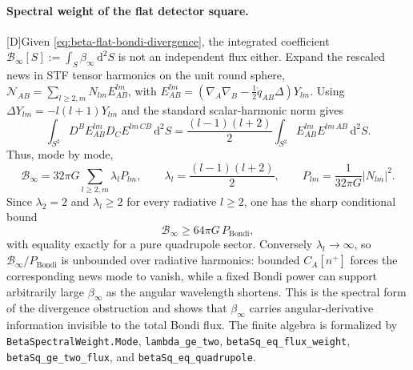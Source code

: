 \documentclass[11pt,a4paper]{article}
\newcommand{\diff}{\mathrm{d}}
\newcommand{\statusD}{\textsf{[D]}}
\begin{document}
\paragraph{Spectral weight of the flat detector square.}
\statusD Given \eqref{eq:beta-flat-bondi-divergence}, the integrated coefficient
\(\mathcal B_\infty[S]:=\int_S\beta_\infty\,\diff^2S\) is not an independent flux either.  Expand the rescaled news in STF tensor harmonics on the unit round sphere,
\(\mathcal N_{AB}=\sum_{l\ge2,m}N_{lm}E^{lm}_{AB}\), with
\(E^{lm}_{AB}=(\nabla_A\nabla_B-\tfrac12\mathring q_{AB}\Delta)Y_{lm}\).  Using
\(\Delta Y_{lm}=-l(l+1)Y_{lm}\) and the standard scalar-harmonic norm gives
\begin{equation}\label{eq:tensor-harmonic-divergence}
  \int_{S^2}D^BE^{lm}_{AB}D_CE^{lm\,CB}\,\diff^2S
  =
  \frac{(l-1)(l+2)}{2}
  \int_{S^2}E^{lm}_{AB}E^{lm\,AB}\,\diff^2S .
\end{equation}
Thus, mode by mode,
\begin{equation}\label{eq:beta-spectral-weight}
  \mathcal B_\infty
  =
  32\pi G\sum_{l\ge2,m}\lambda_l P_{lm},
  \qquad
  \lambda_l=\frac{(l-1)(l+2)}{2},
  \qquad
  P_{lm}=\frac{1}{32\pi G}|N_{lm}|^2 .
\end{equation}
Since \(\lambda_2=2\) and \(\lambda_l\ge2\) for every radiative \(l\ge2\), one has the sharp conditional bound
\begin{equation}\label{eq:beta-flux-inequality}
  \mathcal B_\infty\ge 64\pi G\,P_{\mathrm{Bondi}},
\end{equation}
with equality exactly for a pure quadrupole sector.  Conversely \(\lambda_l\to\infty\), so \(\mathcal B_\infty/P_{\mathrm{Bondi}}\) is unbounded over radiative harmonics: bounded \(C_A[n^+]\) forces the corresponding news mode to vanish, while a fixed Bondi power can support arbitrarily large \(\beta_\infty\) as the angular wavelength shortens.  This is the spectral form of the divergence obstruction and shows that \(\beta_\infty\) carries angular-derivative information invisible to the total Bondi flux.  The finite algebra is formalized by \texttt{BetaSpectralWeight.Mode}, \texttt{lambda\_ge\_two}, \texttt{betaSq\_eq\_flux\_weight}, \texttt{betaSq\_ge\_two\_flux}, and \texttt{betaSq\_eq\_quadrupole}.
\end{document}
